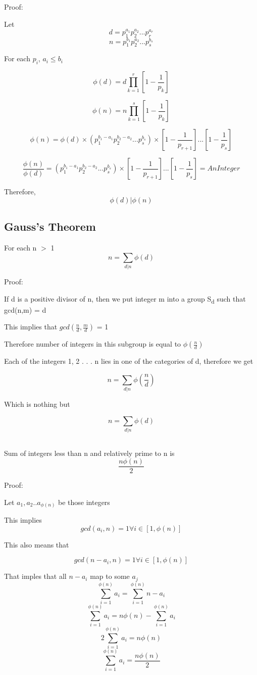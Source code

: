 \documentclass{article}
\begin{document}
Proof:

Let
\[
    d = p_1^{a_1} p_2^{a_2} . . . p_r^{a_r}
\]
\[
    n = p_1^{b_1} p_2^{a_2} . . . p_s^{b_s}
\]

For each \(p_i\), \(a_i \leq b_i\)

\[
    \phi(d) = d\prod_{k=1}^r [1 - \frac{1}{p_k}]
\]

\[
    \phi(n) = n\prod_{k=1}^s [1 - \frac{1}{p_k}]
\]

\[
    \phi(n) = \phi(d) \times (p_1^{b_1-a_1} p_2^{b_2-a_2}. . . p_s^{b_s}) \times [1 - \frac{1}{p_{r+1}}] . . . [1 - \frac{1}{p_s}]
\]

\[
    \frac{\phi(n)}{\phi(d)} = (p_1^{b_1-a_1} p_2^{b_2-a_2}. . . p_s^{b_s}) \times [1 - \frac{1}{p_{r+1}}] . . . [1 - \frac{1}{p_s}] = An Integer
\]

Therefore,
\[
    \phi(d) \vert \phi(n)
\]

\subsection{Gauss's Theorem}
For each n \(>\) 1
\[
    n = \sum_{d\vert n} \phi(d)
\]

Proof:

If d is a positive divisor of n, then we put integer m into a group S\textsubscript{d} such \indent that gcd(n,m) = d

This implies that \(gcd(\frac{n}{d}, \frac{m}{d})\) = 1

Therefore number of integers in this subgroup is equal to \(\phi(\frac{n}{d})\)

Each of the integers 1, 2 . . . n lies in one of the categories of d, therefore \indent we get

\[
    n = \sum_{d\vert n} \phi(\frac{n}{d})
\]

Which is nothing but

\[
    n = \sum_{d\vert n} \phi(d)
\]

\subsection{}

Sum of integers less than n and relatively prime to n is \[\frac{n\phi(n)}{2}\]

Proof:

Let \(a_1, a_2 . . a_{\phi(n)}\) be those integers

This implies
\[
    gcd(a_i, n) = 1 \forall i \in [1,\phi(n)]
\]

This also means that

\[
    gcd(n - a_i, n) = 1 \forall i \in [1,\phi(n)]
\]

That imples that all \(n - a_i\) map to some \(a_j\)
\[
    \sum_{i=1}^{\phi(n)} a_i = \sum_{i=1}^{\phi(n)} n - a_i
\]
\[
    \sum_{i=1}^{\phi(n)} a_i = n\phi(n) - \sum_{i=1}^{\phi(n)} a_i
\]
\[
    2\sum_{i=1}^{\phi(n)} a_i = n\phi(n)
\]
\[
    \sum_{i=1}^{\phi(n)} a_i = \frac{n\phi(n)}{2}
\]
    
\end{document}
